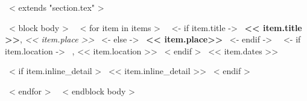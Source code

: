 ~< extends "section.tex" >~

~< block body >~
~< for item in items >~
    ~<- if item.title ->~
    \textbf{<< item.title >>}, \emph{<< item.place >>}
    ~<- else ->~
    \textbf{<< item.place>>}
    ~<- endif ->~
    ~<- if item.location ->~
    , << item.location >>
    ~< endif >~
    \hfill {\small \color{teal} << item.dates >>} \par
    ~< if item.inline_detail >~
    {\footnotesize \color{gray} << item.inline_detail >>}
    ~< endif >~
    \par
~< endfor >~
~< endblock body >~